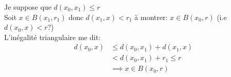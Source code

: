 \begin{explanation}
   Je suppose que $d(x_0, x_1) \le r$\\ 
   Soit $x \in B(x_1, r_1)$ donc $d(x_1, x) < r_1$ à montrer: $x \in B(x_0, r)$ (i.e $d(x_0, x) < r$?)\\
   L'inégalité triangulaire me dit:
   \begin{align*}
       d(x_0, x) &\le d(x_0, x_1) + d(x_1, x)\\
                 &< d(x_0, x_1) + r_1 \le r\\
                 &\implies x \in B(x_0, r)
   \end{align*}
\end{explanation}
